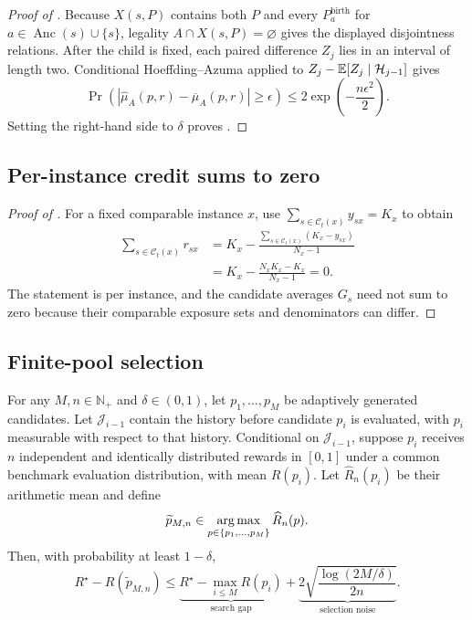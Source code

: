 \begin{proof}[Proof of ]
Because $X(s,P)$ contains both $P$ and every
$P_a^{\mathrm{birth}}$ for $a\in\operatorname{Anc}(s)\cup\{s\}$, legality
$A\cap X(s,P)=\varnothing$ gives the displayed disjointness relations.
After the child is fixed, each paired difference $Z_j$ lies in an interval of
length two.  Conditional Hoeffding--Azuma applied to
$Z_j-\mathbb{E}[Z_j\mid\mathcal H_{j-1}]$ gives
\[
\Pr\!\left(
\left|\widehat\mu_A(p,r)-\overline\mu_A(p,r)\right|\ge\epsilon
\right)
\le 2\exp\!\left(-\frac{n\epsilon^2}{2}\right).
\]
Setting the right-hand side to $\delta$ proves
.
\end{proof}



\subsection{Per-instance credit sums to zero}

\begin{proof}[Proof of ]
For a fixed comparable instance $x$, use
$\sum_{s\in\mathcal C_t(x)}y_{sx}=K_x$ to obtain
\[
\begin{aligned}
\sum_{s\in\mathcal C_t(x)}r_{sx}
&=K_x-
\frac{\sum_{s\in\mathcal C_t(x)}(K_x-y_{sx})}{N_x-1}\\
&=K_x-\frac{N_xK_x-K_x}{N_x-1}=0.
\end{aligned}
\]
The statement is per instance, and the candidate averages $G_s$ need not sum to
zero because their comparable exposure sets and denominators can differ.
\end{proof}



\subsection{Finite-pool selection}

\begin{proposition}
\label{prop:bandwidth_precision}
For any $M,n\in\mathbb N_+$ and $\delta\in(0,1)$, let
$p_1,\ldots,p_M$ be adaptively generated candidates.  Let
$\mathcal J_{i-1}$ contain the history before candidate $p_i$ is evaluated,
with $p_i$ measurable with respect to that history.  Conditional on
$\mathcal J_{i-1}$, suppose $p_i$ receives $n$ independent and identically
distributed rewards in $[0,1]$ under a common benchmark evaluation
distribution, with mean $R(p_i)$.  Let $\widehat R_n(p_i)$ be their
arithmetic mean and define
\[
\widetilde p_{M,n}\in\operatorname*{arg\,max}_{p\in\{p_1,\ldots,p_M\}}\widehat R_n(p).
\]
Then, with probability at least $1-\delta$,
\begin{equation}
R^\star-R(\widetilde p_{M,n})
\le
\underbrace{R^\star-\max_{i\le M}R(p_i)}_{\text{search gap}}
+\underbrace{2\sqrt{\frac{\log(2M/\delta)}{2n}}}_{\text{selection noise}}.
\label{eq:bandwidth_variance_regret}
\end{equation}
\end{proposition}

